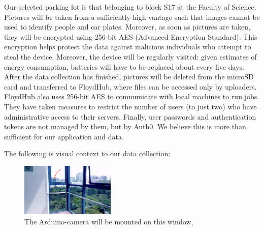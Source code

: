 \documentclass[a4paper, 11pt]{article} %
\begin{document}
		Our selected parking lot is that belonging to block S17 at the Faculty of Science. Pictures will be 
		taken from a sufficiently-high vantage such that images cannot be used to identify people and car 
		plates. Moreover, as soon as pictures are taken, they will be encrypted using 256-bit AES 
		(Advanced Encryption Standard). This encryption helps protect the data against malicious 
		individuals who attempt to steal the device. Moreover, the device will be regularly visited: given 
		estimates of energy consumption, batteries will have to be replaced about every five days. After 
		the data collection has finished, pictures will be deleted from the microSD card and transferred to 
		FloydHub, where files can be accessed only by uploaders. FloydHub also uses 256-bit AES to 
		communicate with local machines to run jobs. They have taken measures to restrict the number of 
		users (to just two) who have administrative access to their servers. Finally, user passwords and 
		authentication tokens are not managed by them, but by Auth0. We believe this is more than 
		sufficient for our application and data.
		
		\hspace*{-6mm}The following is visual context to our data collection:
		\vskip 5mm
		\begin{figure}[h]
		    \centering
		    \includegraphics[width=0.4\textwidth]{figures/context_used.jpg}
		    \caption{The Arduino-camera will be mounted on this window,}
		\end{figure}
	
\end{document}
